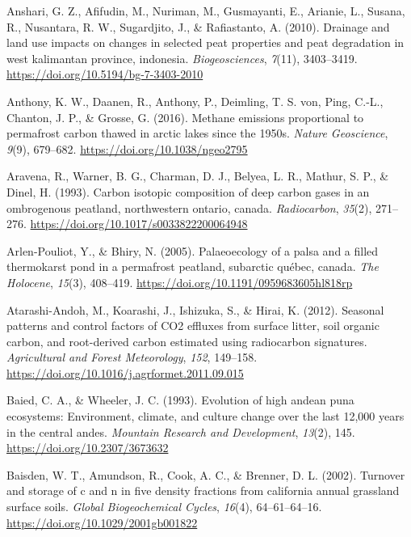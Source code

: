 \documentclass[]{article}
\begin{document}
\leavevmode\hypertarget{ref-Anshari_2010}{}%
Anshari, G. Z., Afifudin, M., Nuriman, M., Gusmayanti, E., Arianie, L.,
Susana, R., Nusantara, R. W., Sugardjito, J., \& Rafiastanto, A. (2010).
Drainage and land use impacts on changes in selected peat properties and
peat degradation in west kalimantan province, indonesia.
\emph{Biogeosciences}, \emph{7}(11), 3403--3419.
\url{https://doi.org/10.5194/bg-7-3403-2010}

\leavevmode\hypertarget{ref-Walter_Anthony_2016}{}%
Anthony, K. W., Daanen, R., Anthony, P., Deimling, T. S. von, Ping,
C.-L., Chanton, J. P., \& Grosse, G. (2016). Methane emissions
proportional to permafrost carbon thawed in arctic lakes since the
1950s. \emph{Nature Geoscience}, \emph{9}(9), 679--682.
\url{https://doi.org/10.1038/ngeo2795}

\leavevmode\hypertarget{ref-Aravena_1993}{}%
Aravena, R., Warner, B. G., Charman, D. J., Belyea, L. R., Mathur, S.
P., \& Dinel, H. (1993). Carbon isotopic composition of deep carbon
gases in an ombrogenous peatland, northwestern ontario, canada.
\emph{Radiocarbon}, \emph{35}(2), 271--276.
\url{https://doi.org/10.1017/s0033822200064948}

\leavevmode\hypertarget{ref-Arlen_Pouliot_2005}{}%
Arlen-Pouliot, Y., \& Bhiry, N. (2005). Palaeoecology of a palsa and a
filled thermokarst pond in a permafrost peatland, subarctic québec,
canada. \emph{The Holocene}, \emph{15}(3), 408--419.
\url{https://doi.org/10.1191/0959683605hl818rp}

\leavevmode\hypertarget{ref-Atarashi_Andoh_2012}{}%
Atarashi-Andoh, M., Koarashi, J., Ishizuka, S., \& Hirai, K. (2012).
Seasonal patterns and control factors of CO2 effluxes from surface
litter, soil organic carbon, and root-derived carbon estimated using
radiocarbon signatures. \emph{Agricultural and Forest Meteorology},
\emph{152}, 149--158.
\url{https://doi.org/10.1016/j.agrformet.2011.09.015}

\leavevmode\hypertarget{ref-Baied_1993}{}%
Baied, C. A., \& Wheeler, J. C. (1993). Evolution of high andean puna
ecosystems: Environment, climate, and culture change over the last
12,000 years in the central andes. \emph{Mountain Research and
Development}, \emph{13}(2), 145. \url{https://doi.org/10.2307/3673632}

\leavevmode\hypertarget{ref-Baisden_2002}{}%
Baisden, W. T., Amundson, R., Cook, A. C., \& Brenner, D. L. (2002).
Turnover and storage of c and n in five density fractions from
california annual grassland surface soils. \emph{Global Biogeochemical
Cycles}, \emph{16}(4), 64--61--64--16.
\url{https://doi.org/10.1029/2001gb001822}
\end{document}
